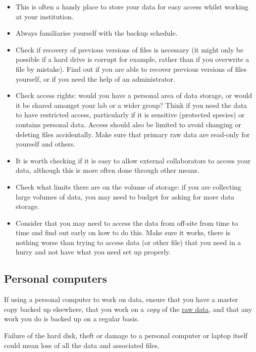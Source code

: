 \documentclass[12pt,a4paper,oneside]{report}
\providecommand{\tightlist}{%
  \setlength{\itemsep}{0pt}\setlength{\parskip}{0pt}}
\begin{document}
\begin{itemize}
\tightlist
\item
  This is often a handy place to store your data for easy access whilst
  working at your institution.
\item
  Always familiarise yourself with the backup schedule.
\item
  Check if recovery of previous versions of files is necessary (it might
  only be possible if a hard drive is corrupt for example, rather than
  if you overwrite a file by mistake). Find out if you are able to
  recover previous versions of files yourself, or if you need the help
  of an administrator.
\item
  Check access rights: would you have a personal area of data storage,
  or would it be shared amongst your lab or a wider group? Think if you
  need the data to have restricted access, particularly if it is
  sensitive (protected species) or contains personal data. Access should
  also be limited to avoid changing or deleting files accidentally. Make
  sure that primary raw data are read-only for yourself and others.
\item
  It is worth checking if it is easy to allow external collaborators to
  access your data, although this is more often done through other
  means.
\item
  Check what limits there are on the volume of storage: if you are
  collecting large volumes of data, you may need to budget for asking
  for more data storage.
\item
  Consider that you may need to access the data from off-site from time
  to time and find out early on how to do this. Make sure it works,
  there is nothing worse than trying to access data (or other file) that
  you need in a hurry and not have what you need set up properly.
\end{itemize}

\hypertarget{personal-computers}{%
\subsection{Personal computers}\label{personal-computers}}

If using a personal computer to work on data, ensure that you have a
master copy backed up elsewhere, that you work on a \emph{copy} of the
\protect\hyperlink{working-on-your-data}{raw data}, and that any work
you do is backed up on a regular basis.

Failure of the hard disk, theft or damage to a personal computer or
laptop itself could mean loss of all the data and associated files.
\end{document}
